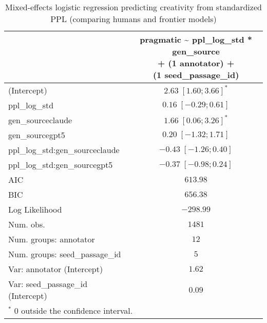 
\usepackage{booktabs}

\begin{table}[htbp]
\begin{center}
\begin{tabular}{l c}
\toprule
 & \shortstack[l]{pragmatic \textasciitilde{} ppl\_log\_std * gen\_source  \\ 
+ (1 \textbar{} annotator) + \\ 
(1 \textbar{} seed\_passage\_id)} \\
\midrule
(Intercept)                        & $2.63 \; [ 1.60; 3.66]^{*}$ \\
ppl\_log\_std                      & $0.16 \; [-0.29; 0.61]$     \\
gen\_sourceclaude                  & $1.66 \; [ 0.06; 3.26]^{*}$ \\
gen\_sourcegpt5                    & $0.20 \; [-1.32; 1.71]$     \\
ppl\_log\_std:gen\_sourceclaude    & $-0.43 \; [-1.26; 0.40]$    \\
ppl\_log\_std:gen\_sourcegpt5      & $-0.37 \; [-0.98; 0.24]$    \\
\midrule
AIC                                & $613.98$                    \\
BIC                                & $656.38$                    \\
Log Likelihood                     & $-298.99$                   \\
Num. obs.                          & $1481$                      \\
Num. groups: annotator             & $12$                        \\
Num. groups: seed\_passage\_id     & $5$                         \\
Var: annotator (Intercept)         & $1.62$                      \\
Var: seed\_passage\_id (Intercept) & $0.09$                      \\
\bottomrule
\multicolumn{2}{l}{\scriptsize{$^*$ 0 outside the confidence interval.}}
\end{tabular}
\caption{Mixed-effects logistic regression predicting creativity from standardized PPL (comparing humans and frontier models)}
\label{tab:glmer_ppl_prag_src_front}
\end{center}
\end{table}
